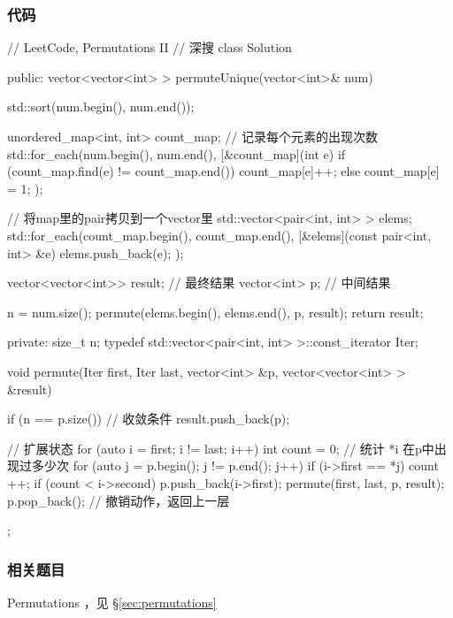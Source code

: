 \subsubsection{代码}
\begin{Code}
// LeetCode, Permutations II
// 深搜
class Solution {
public:
    vector<vector<int> > permuteUnique(vector<int>& num) {
        std::sort(num.begin(), num.end());

        unordered_map<int, int> count_map; // 记录每个元素的出现次数
        std::for_each(num.begin(), num.end(), [&count_map](int e) {
            if (count_map.find(e) != count_map.end())
                count_map[e]++;
            else
                count_map[e] = 1;
        });

        // 将map里的pair拷贝到一个vector里
        std::vector<pair<int, int> > elems;
        std::for_each(count_map.begin(), count_map.end(),
                [&elems](const pair<int, int> &e) {
                    elems.push_back(e);
                });

        vector<vector<int>> result; // 最终结果
        vector<int> p;  // 中间结果

        n = num.size();
        permute(elems.begin(), elems.end(), p, result);
        return result;
    }

private:
    size_t n;
    typedef std::vector<pair<int, int> >::const_iterator Iter;

    void permute(Iter first, Iter last, vector<int> &p,
            vector<vector<int> > &result) {
        if (n == p.size()) {  // 收敛条件
            result.push_back(p);
        }

        // 扩展状态
        for (auto i = first; i != last; i++) {
            int count = 0; // 统计 *i 在p中出现过多少次
            for (auto j = p.begin(); j != p.end(); j++) {
                if (i->first == *j) {
                    count ++;
                }
            }
            if (count < i->second) {
                p.push_back(i->first);
                permute(first, last, p, result);
                p.pop_back(); // 撤销动作，返回上一层
            }
        }
    }
};
\end{Code}


\subsubsection{相关题目}
\begindot
\item Permutations ，见 \S \ref{sec:permutations}
\myenddot
